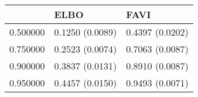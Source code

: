 \begin{tabular}{lll}
\toprule
 & ELBO & FAVI \\
\midrule
0.500000 & 0.1250 (0.0089) & 0.4397 (0.0202) \\
0.750000 & 0.2523 (0.0074) & 0.7063 (0.0087) \\
0.900000 & 0.3837 (0.0131) & 0.8910 (0.0087) \\
0.950000 & 0.4457 (0.0150) & 0.9493 (0.0071) \\
\bottomrule
\end{tabular}
